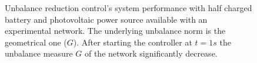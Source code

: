 \begin{figure}[ht]

                 \caption{Unbalance reduction control's system performance with half charged battery and photovoltaic power source available with an experimental network. The underlying unbalance norm is the geometrical one ($G$). After starting the controller at $t=1s$ the unbalance measure $G$ of the network significantly decrease.}
                 \label{fig:compare_asym_PV}
                \end{figure}








